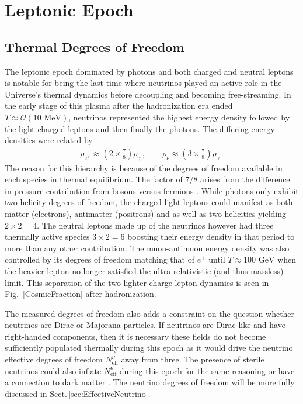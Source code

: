 \documentclass[universe,article,submit,moreauthors,pdftex,a4paper]{Definitions/mdpi}
\newcommand{\GeV}{\text{ GeV}}
\newcommand{\MeV}{\text{ MeV}}
\newcommand*{\rf}[1]{Fig.~{\ref{#1}}}
\newcommand*{\rsec}[1]{Sect.\,{\ref{#1}}}
\begin{document}
\section{Leptonic Epoch} \label{sec:Leptonic}
\subsection{Thermal Degrees of Freedom}\label{sec:Freedom}
\noindent The leptonic epoch dominated by photons and both charged and neutral leptons is notable for being the last time where neutrinos played an active role in the Universe's thermal dynamics before decoupling and becoming free-streaming. In the early stage of this plasma after the hadronization era ended $T\approx\mathcal{O}(10\MeV)$, neutrinos represented the highest energy density followed by the light charged leptons and then finally the photons. The differing energy densities were related by
\begin{align}
\rho_{e^{\pm}}\approx\left(2\times\frac{7}{8}\right)\rho_{\gamma}\,,\qquad\rho_{\nu}\approx\left(3\times\frac{7}{8}\right)\rho_{\gamma}\,.
\end{align}
The reason for this hierarchy is because of the degrees of freedom \cite{Coleman:2003hs,Rafelski:2013yka} available in each species in thermal equilibrium. The factor of $7/8$ arises from the difference in pressure contribution from bosons versus fermions \cite{Rafelski:2013yka}. While photons only exhibit two helicity degrees of freedom, the charged light leptons could manifest as both matter (electrons), antimatter (positrons) and as well as two helicities yielding $2\times2=4$. The neutral leptons made up of the neutrinos however had three thermally active species $3\times2=6$ boosting their energy density in that period to more than any other contribution. The muon-antimuon energy density was also controlled by its degrees of freedom matching that of $e^{\pm}$ until $T\approx100\GeV$ when the heavier lepton no longer satisfied the ultra-relativistic (and thus massless) limit. This separation of the two lighter charge lepton dynamics is seen in \rf{CosmicFraction} after hadronization.

The measured degrees of freedom also adds a constraint on the question whether neutrinos are Dirac or Majorana particles. If neutrinos are Dirac-like and have right-handed components, then it is necessary these fields do not become sufficiently populated thermally during this epoch as it would drive the neutrino effective degrees of freedom $N^{\nu}_{\mathrm{eff}}$ away from three. The presence of sterile neutrinos could also inflate $N_{\mathrm{eff}}^{\nu}$ during this epoch for the same reasoning \cite{Kopp:2011qd,Hamann:2011ge,Kopp:2013vaa,Lello:2014yha,Birrell:2014qna} or have a connection to dark matter \cite{Weinberg:2013kea,Giusarma:2014zza}. The neutrino degrees of freedom will be more fully discussed in \rsec{sec:EffectiveNeutrino}.
\end{document}
